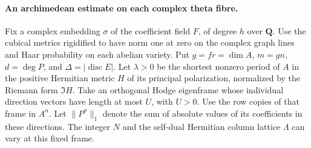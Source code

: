 \paragraph{An archimedean estimate on each complex theta fibre.}
Fix a complex embedding \(\sigma\) of the coefficient field \(F\),
of degree \(h\) over \(\mathbf Q\). Use the cubical metrics
rigidified to have norm one at zero on the complex graph lines and
Haar probability on each abelian variety. Put \(g=fr=\dim A\),
\(m=gn\), \(d=\deg P\), and \(\Delta=|\operatorname{disc}E|\).
Let \(\lambda>0\) be the shortest nonzero period of \(A\) in the
positive Hermitian metric \(H\) of its principal polarization,
normalized by the Riemann form \(\Im H\). Take an orthogonal Hodge
eigenframe whose individual direction vectors have length at most
\(U\), with \(U>0\). Use the row copies of that frame in \(A^n\).
Let \(\|P^\sigma\|_1\) denote the sum of absolute values of its
coefficients in these directions. The integer \(N\) and the self-dual
Hermitian column lattice \(\Lambda\) can vary at this fixed frame.

